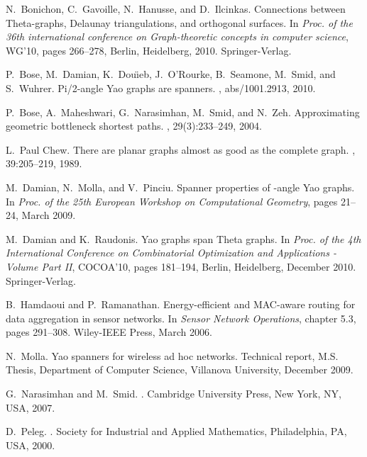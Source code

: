 \documentclass[11pt]{article}
\begin{document}
\def\cprime{}
\begin{thebibliography}{10}

N.~Bonichon, C.~Gavoille, N.~Hanusse, and D.~Ilcinkas.
\newblock Connections between {T}heta-graphs, {D}elaunay triangulations, and
  orthogonal surfaces.
\newblock In {\em Proc. of the 36th international conference on Graph-theoretic
  concepts in computer science}, WG'10, pages 266--278, Berlin, Heidelberg,
  2010. Springer-Verlag.

P.~Bose, M.~Damian, K.~Dou\"{\i}eb, J.~O'Rourke, B.~Seamone, M.~Smid, and
  S.~Wuhrer.
\newblock Pi/2-angle {Y}ao graphs are spanners.
, abs/1001.2913, 2010.

P.~Bose, A.~Maheshwari, G.~Narasimhan, M.~Smid, and N.~Zeh.
\newblock Approximating geometric bottleneck shortest paths.
,
  29(3):233--249, 2004.

L.~Paul Chew.
\newblock There are planar graphs almost as good as the complete graph.
, 39:205--219, 1989.

M.~Damian, N.~Molla, and V.~Pinciu.
\newblock Spanner properties of -angle {Y}ao graphs.
\newblock In {\em Proc. of the 25th European Workshop on Computational
  Geometry}, pages 21--24, March 2009.

M.~Damian and K.~Raudonis.
\newblock Yao graphs span {T}heta graphs.
\newblock In {\em Proc. of the 4th International Conference on Combinatorial
  Optimization and Applications - Volume Part II}, COCOA'10, pages 181--194,
  Berlin, Heidelberg, December 2010. Springer-Verlag.

B.~Hamdaoui and P.~Ramanathan.
\newblock Energy-efficient and {MAC}-aware routing for data aggregation in
  sensor networks.
\newblock In {\em Sensor Network Operations}, chapter 5.3, pages 291--308.
  Wiley-IEEE Press, March 2006.

N.~Molla.
\newblock Yao spanners for wireless ad hoc networks.
\newblock Technical report, M.S. Thesis, Department of Computer Science,
  Villanova University, December 2009.

G.~Narasimhan and M.~Smid.
.
\newblock Cambridge University Press, New York, NY, USA, 2007.

D.~Peleg.
.
\newblock Society for Industrial and Applied Mathematics, Philadelphia, PA,
  USA, 2000.

\end{thebibliography}
\end{document}
